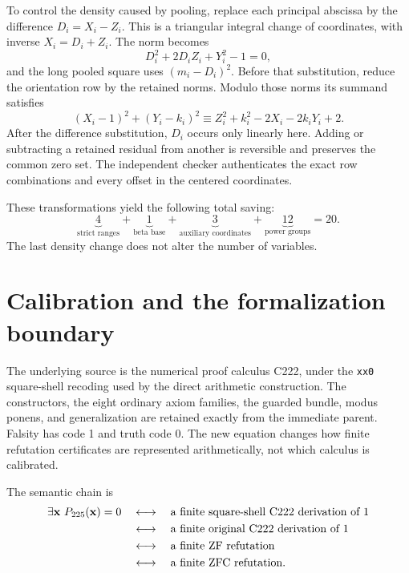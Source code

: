 \documentclass[11pt,letterpaper]{article}
\theoremstyle{definition}\newtheorem{definition}[theorem]{Definition}
\theoremstyle{remark}\newtheorem{remark}[theorem]{Remark}
\begin{document}
To control the density caused by pooling, replace each principal
abscissa by the difference
\(D_i=X_i-Z_i\). This is a triangular integral change of coordinates,
with inverse \(X_i=D_i+Z_i\). The norm becomes
\[
D_i^2+2D_iZ_i+Y_i^2-1=0,
\]
and the long pooled square uses \((m_i-D_i)^2\).
Before that substitution, reduce the orientation row by the retained
norms. Modulo those norms its summand satisfies
\[
(X_i-1)^2+(Y_i-k_i)^2
\equiv Z_i^2+k_i^2-2X_i-2k_iY_i+2.
\]
After the difference substitution, \(D_i\) occurs only linearly here.
Adding or subtracting a retained residual from another is reversible
and preserves the common zero set. The independent checker authenticates
the exact row combinations and every offset in the centered coordinates.

These transformations yield the following total saving:
\[
\underbrace{4}_{\text{strict ranges}}+
\underbrace{1}_{\text{beta base}}+
\underbrace{3}_{\text{auxiliary coordinates}}+
\underbrace{12}_{\text{power groups}}=20.
\]
The last density change does not alter the number of variables.

\section{Calibration and the formalization boundary}
\label{sec:calibration}

The underlying source is the numerical proof calculus C222, under the
\texttt{xx0} square-shell recoding used by the direct arithmetic
construction. The
constructors, the eight ordinary axiom families, the guarded bundle,
modus ponens, and generalization are retained exactly from the immediate
parent. Falsity has code 1 and truth code 0. The new equation
changes how finite refutation certificates are represented arithmetically,
not which calculus is calibrated.

The semantic chain is
\[
\begin{split}
\exists\mathbf x\ P_{225}(\mathbf x)=0
&\quad\longleftrightarrow\quad
\text{a finite square-shell C222 derivation of 1}\\
&\quad\longleftrightarrow\quad
\text{a finite original C222 derivation of 1}\\
&\quad\longleftrightarrow\quad
\text{a finite ZF refutation}\\
&\quad\longleftrightarrow\quad
\text{a finite ZFC refutation}.
\end{split}
\]
\end{document}
